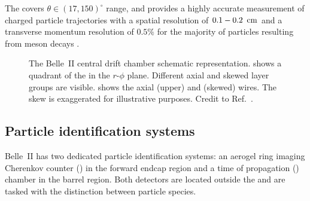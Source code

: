 The \CDC covers $\theta\in(17,150)^{\circ}$ range, and provides a highly accurate measurement of charged particle trajectories with a spatial resolution of $0.1-0.2~{\rm \,cm}$
and a transverse momentum resolution of $0.5\%$ for the majority of particles resulting from \B meson decays \cite{Kandra:2019qlz}.

\begin{figure}[htbp!]
    \centering
    \caption{\label{fig:cdc}
    The Belle~II central drift chamber schematic representation.
     shows a quadrant of the \CDC in the $r$-$\phi$ plane.
    Different axial and skewed layer groups are visible.
     shows the axial (upper) and (skewed) wires.
    The skew is exaggerated for illustrative purposes.
    Credit to Ref.~\cite{BelleIITrackingGroup:2020hpx}.
    }
\end{figure}

\subsection{Particle identification systems}\label{sec:pid}

Belle~II has two dedicated particle identification systems: an aerogel ring imaging Cherenkov counter (\ARICH) in the forward endcap region
and a time of propagation (\TOP) chamber in the barrel region. 
Both detectors are located outside the \CDC and are tasked with the distinction between particle species.

